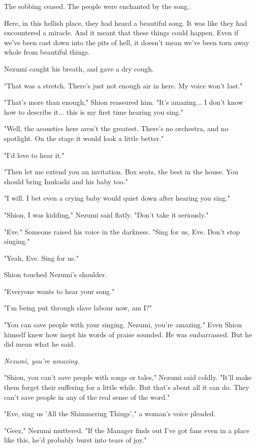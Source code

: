 The sobbing ceased. The people were enchanted by the song.

Here, in this hellish place, they had heard a beautiful song. It was
like they had encountered a miracle. And it meant that these things
could happen. Even if we've been cast down into the pits of hell, it
doesn't mean we've been torn away whole from beautiful things.

Nezumi caught his breath, and gave a dry cough.

"That was a stretch. There's just not enough air in here. My voice won't
last."

"That's more than enough," Shion reassured him. "It's amazing... I don't
know how to describe it... this is my first time hearing you sing."

"Well, the acoustics here aren't the greatest. There's no orchestra, and
no spotlight. On the stage it would look a little better."

"I'd love to hear it."

"Then let me extend you an invitation. Box seats, the best in the house.
You should bring Inukashi and his baby too."

"I will. I bet even a crying baby would quiet down after hearing you
sing."

"Shion, I was kidding," Nezumi said flatly. "Don't take it seriously."

"Eve." Someone raised his voice in the darkness. "Sing for us, Eve.
Don't stop singing."

"Yeah, Eve. Sing for us."

Shion touched Nezumi's shoulder.

"Everyone wants to hear your song."

"I'm being put through slave labour now, am I?"

"You can save people with your singing. Nezumi, you're amazing." Even
Shion himself knew how inept his words of praise sounded. He was
embarrassed. But he did mean what he said.

\emph{Nezumi, you're amazing.}

"Shion, you can't save people with songs or tales," Nezumi said coldly.
"It'll make them forget their suffering for a little while. But that's
about all it can do. They can't save people in any of the real sense of
the word."

"Eve, sing us 'All the Shimmering Things'," a woman's voice pleaded.

"Geez," Nezumi muttered. "If the Manager finds out I've got fans even in
a place like this, he'd probably burst into tears of joy."

